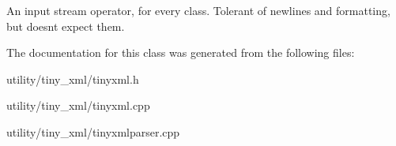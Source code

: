 An input stream operator, for every class. Tolerant of newlines and formatting, but doesn\textquotesingle{}t expect them. 

The documentation for this class was generated from the following files\+:\begin{DoxyCompactItemize}
\item 
utility/tiny\+\_\+xml/tinyxml.\+h\item 
utility/tiny\+\_\+xml/tinyxml.\+cpp\item 
utility/tiny\+\_\+xml/tinyxmlparser.\+cpp\end{DoxyCompactItemize}
